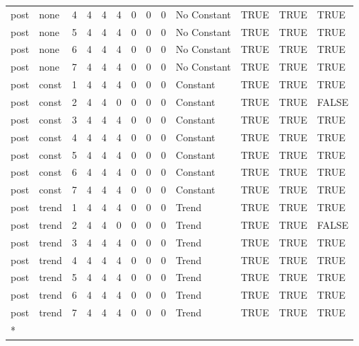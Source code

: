 \begin{longtable}[t]{llrrrrrrrllll}
\addlinespace
post & none & 4 & 4 & 4 & 4 & 0 & 0 & 0 & No Constant & TRUE & TRUE & TRUE\\
post & none & 5 & 4 & 4 & 4 & 0 & 0 & 0 & No Constant & TRUE & TRUE & TRUE\\
post & none & 6 & 4 & 4 & 4 & 0 & 0 & 0 & No Constant & TRUE & TRUE & TRUE\\
post & none & 7 & 4 & 4 & 4 & 0 & 0 & 0 & No Constant & TRUE & TRUE & TRUE\\
post & const & 1 & 4 & 4 & 4 & 0 & 0 & 0 & Constant & TRUE & TRUE & TRUE\\
\addlinespace
post & const & 2 & 4 & 4 & 0 & 0 & 0 & 0 & Constant & TRUE & TRUE & FALSE\\
post & const & 3 & 4 & 4 & 4 & 0 & 0 & 0 & Constant & TRUE & TRUE & TRUE\\
post & const & 4 & 4 & 4 & 4 & 0 & 0 & 0 & Constant & TRUE & TRUE & TRUE\\
post & const & 5 & 4 & 4 & 4 & 0 & 0 & 0 & Constant & TRUE & TRUE & TRUE\\
post & const & 6 & 4 & 4 & 4 & 0 & 0 & 0 & Constant & TRUE & TRUE & TRUE\\
\addlinespace
post & const & 7 & 4 & 4 & 4 & 0 & 0 & 0 & Constant & TRUE & TRUE & TRUE\\
post & trend & 1 & 4 & 4 & 4 & 0 & 0 & 0 & Trend & TRUE & TRUE & TRUE\\
post & trend & 2 & 4 & 4 & 0 & 0 & 0 & 0 & Trend & TRUE & TRUE & FALSE\\
post & trend & 3 & 4 & 4 & 4 & 0 & 0 & 0 & Trend & TRUE & TRUE & TRUE\\
post & trend & 4 & 4 & 4 & 4 & 0 & 0 & 0 & Trend & TRUE & TRUE & TRUE\\
\addlinespace
post & trend & 5 & 4 & 4 & 4 & 0 & 0 & 0 & Trend & TRUE & TRUE & TRUE\\
post & trend & 6 & 4 & 4 & 4 & 0 & 0 & 0 & Trend & TRUE & TRUE & TRUE\\
post & trend & 7 & 4 & 4 & 4 & 0 & 0 & 0 & Trend & TRUE & TRUE & TRUE\\*
\end{longtable}
\endgroup{}
